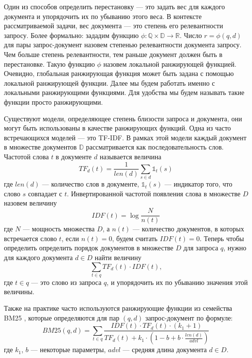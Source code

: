 \documentclass[specialist,
               substylefile = spbu.rtx,
               subf,href,colorlinks=true, 12pt]{disser}
\begin{document}
Один из способов определить перестановку --- это задать вес для каждого документа и упорядочить их по убыванию этого веса. В контексте рассматриваемой задачи, вес документа --- это степень его релевантности запросу. Более формально: зададим функцию ${\phi:\mathbb Q \times \mathbb D \rightarrow \mathbb {R}}$. Число  ${r = \phi(q, d)}$  для пары запрос-документ назовем степенью релевантности документа запросу. Чем больше степень релевантности, тем раньше документ должен быть в перестановке. Такую функцию $\phi$ назовем локальной ранжирующей функцией. Очевидно, глобальная ранжирующая функция может быть задана с помощью локальной ранжирующей функции.  
Далее мы будем работать именно с локальными ранжирующими функциями. Для удобства мы будем называть такие функции просто ранжирующими.\par

Существуют модели, определяющее степень близости запроса и документа, они могут быть использованы в качестве ранжирующих функций. Одна из часто встречающихся моделей --- это TF-IDF. В рамках этой модели каждый документ в множестве документов $\mathbb D$ рассматривается как последовательность слов. Частотой слова $t$ в документе $d$ называется величина
\begin{equation*}
TF_d(t) = \frac{1}{len(d)}\sum_{s \in d}{\mathds{1}_t(s)}\,
\end{equation*} где $len(d)$ --- количество слов в документе, ${\mathds{1}_t(s)}$ --- индикатор того, что слово $s$ совпадает с $t$. Инвертированной частотой появления слова в множестве $D$ назовем величину 
\begin{equation*}
IDF(t) = \log\frac{N}{n(t)}\,
\end{equation*} где $N$ --- мощность множества $D$, а $n(t)$ ---  количество документов, в которых встречается слово $t$, если $n(t) = 0$, будем считать $IDF(t) = 0$. Теперь чтобы определить определить порядок документов в множестве $D$ для запроса $q$, нужно для каждого документа $d \in D$ найти величину $$\sum_{t \in q}{TF_d(t) \cdot IDF(t)},$$ где $t \in q$ --- это слово из запроса $q$, и упорядочить их по убыванию значения этой величины.\par

Также на практике часто используются ранжирующие функции из семейства BM25 \cite{BM25},  которые определяются для пар $(q, d)$ запрос-документ по формуле:
\begin{equation*}
BM25(q, d) = \sum_{t \in q}{\frac{IDF(t) \cdot TF_d(t) \cdot (k_1 + 1)}{TF_d(t) + k_1 \cdot (1 - b + b \cdot \frac{len(d)}{advl})}}\,
\end{equation*} где $k_1$, $b$ ---  некоторые параметры, $advl$ ---  средняя длина документа $d \in D$.\par
 
\end{document}
